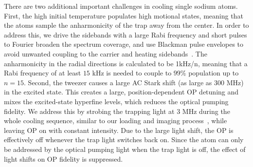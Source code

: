 \documentclass[aps,prl,twocolumn,groupedaddress]{revtex4-1}
\begin{document}
There are two additional important challenges in cooling single sodium atoms.
First, the high initial temperature populates high motional states,
meaning that the atoms sample the anharmonicity of the trap away from the center.
In order to address this, we drive the sidebands with a large Rabi frequency
and short pulses to Fourier broaden the spectrum coverage, and use Blackman pulse envelopes
to avoid unwanted coupling to the carrier and heating sidebands~\cite{Kasevich1992}.
The anharmonicity in the radial directions is calculated to be 1kHz/n, meaning that a
Rabi frequency of at least $15$ kHz is needed to couple to $99$\% population up to $n=15$.
Second, the tweezer causes a large AC Stark shift (as large as $300$ MHz)
in the excited state. This creates a large, position-dependent OP detuning
and mixes the excited-state hyperfine levels, which reduces the optical pumping fidelity.
We address this by strobing the trapping light at 3 MHz during the whole cooling sequence,
similar to our loading and imaging process~\cite{Hutzler2017-LightShifts},
while leaving OP on with constant intensity.
Due to the large light shift, the OP is effectively off whenever the trap light switches back on.
Since the atom can only be addressed by the optical pumping light when the trap light is off,
the effect of light shifts on OP fidelity is suppressed.
\end{document}
